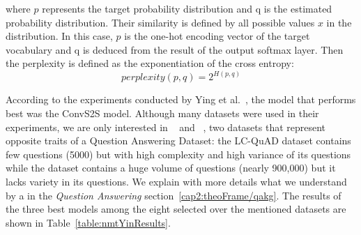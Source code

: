 \noindent where $p$ represents the target probability distribution and q is the estimated probability 
distribution. Their similarity is defined by all possible values $x$ in the distribution. In 
this case, $p$ is the one-hot encoding vector of the target vocabulary and q is deduced from 
the result of the output softmax layer. Then the perplexity is defined as the exponentiation 
of the cross entropy:
\[
    perplexity(p,q)=2^{H(p,q)}
\]

According to the experiments conducted by Ying et al.~\cite{nmt:nl-to-sparql-Yin19}, the model 
that performs best was the ConvS2S model. Although many datasets were used in their experiments, 
we are only interested in \LCQuADone~\cite{dataset:lcquad2-DubeyBA019} and 
\DBNQA~\cite{dataset:dbnqa-hartmann-marx-soru-2018}, two datasets that represent opposite traits 
of a Question Answering Dataset: the LC-QuAD dataset contains few questions (5000) but with high 
complexity and high variance of its questions while the \DBNQA{} dataset contains a huge volume of 
questions (nearly 900,000) but it lacks variety in its questions. We explain with more details 
what we understand by a  in the \textit{Question Answering} section~\ref{cap2:theoFrame/qakg}. 
The results of the three best models among the eight selected over the mentioned datasets are 
shown in Table~\ref{table:nmtYinResults}.


